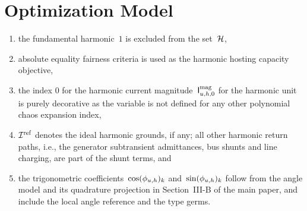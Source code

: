 \appendices

\section{Optimization Model}
\label{app:optimization_model}

\begin{enumerate}
    \item the fundamental harmonic~$1$ is excluded from the set~$\mathcal{H}$,
    \item absolute equality fairness criteria is used as the harmonic hosting capacity objective,
    \item the index 0 for the harmonic current magnitude~$\mathsf{I}^{\text{mag}}_{u,h,0}$ for the harmonic unit is purely decorative as the variable is not defined for any other polynomial chaos expansion index,
    \item $\mathcal{I}^{\text{ref}}$ denotes the ideal harmonic grounds, if any; all other harmonic return paths, i.e., the generator subtransient admittances, bus shunts and line charging, are part of the shunt terms, and
    \item the trigonometric coefficients~$\cos(\phi_{u,h})_{k}$ and~$\sin(\phi_{u,h})_{k}$ follow from the angle model and its quadrature projection in Section~III-B of the main paper, and include the local angle reference and the type germs.
\end{enumerate}


